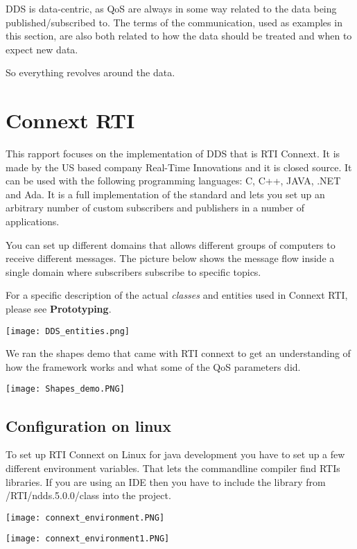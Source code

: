 DDS is data-centric, as QoS are always in some way related to the data being published/subscribed to. The terms of the communication, used as examples in this section, are also both related to how the data should be treated and when to expect new data. 

So everything revolves around the data.


\section{Connext RTI}
This rapport focuses on the implementation of DDS that is RTI Connext. It is made by the US based company Real-Time Innovations and it is closed source. It can be used with the following programming languages: C, C++, JAVA, .NET and Ada. 
It is a full implementation of the standard and lets you set up an arbitrary number of custom subscribers and publishers in a number of applications.

You can set up different domains that allows different groups of computers to receive different messages. The picture below shows the message flow inside a single domain where subscribers subscribe to specific topics.

For a specific description of the actual \textit{classes} and entities used in Connext RTI, please see \textbf{Prototyping}.

\begin{center}
	\texttt{[image: DDS\_entities.png]}
\end{center}

We ran the shapes demo that came with RTI connext to get an understanding of how the framework works and what some of the QoS parameters did.

\begin{center}
	\texttt{[image: Shapes\_demo.PNG]}
\end{center}

\subsection{Configuration on linux}

To set up RTI Connext on Linux for java development you have to set up a few different environment variables. That lets the commandline compiler find RTIs libraries. If you are using an IDE then you have to include the library from /RTI/ndds.5.0.0/class into the project.

\begin{center}
	\texttt{[image: connext\_environment.PNG]}
\end{center}

\begin{center}
	\texttt{[image: connext\_environment1.PNG]}
\end{center}
